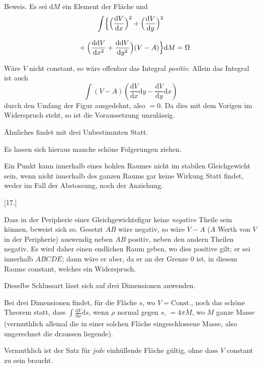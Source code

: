 Beweis. Es sei $\mathrm{d}M$ ein Element der Fläche und
\[
\begin{gathered}\int\Bigl\{
\Bigl(\frac{\mathrm{d}V}{\mathrm{d}x}\Bigr)^2
+\Bigl(\frac{\mathrm{d}V}{\mathrm{d}y}\Bigr)^2
\\[8pt]\quad{}+\Bigl(\frac{\mathrm{dd}V}{\mathrm{d}x^2}
+\frac{\mathrm{dd}V}{\mathrm{d}y^2}\Bigr)(V-A)
\Bigr\}\mathrm{d}M=\Omega\end{gathered}
\]


Wäre $V$ nicht constant, so wäre offenbar das Integral \emph{positiv}. Allein das Integral ist auch
\[
\int(V-A)\left(\frac{\mathrm{d}V}{\mathrm{d}x}\mathrm{d}y
-\frac{\mathrm{d}V}{\mathrm{d}y}\mathrm{d}x\right)
\]
durch den Umfang der Figur ausgedehnt, also $=0$. Da dies mit dem Vorigen
im Widerspruch steht, so ist die Voraussetzung unzulässig.

Ähnliches findet mit drei Unbestimmten Statt.

Es lassen sich hieraus manche schöne Folgerungen ziehen.

Ein Punkt kann innerhalb eines hohlen Raumes nicht im stabilen Gleichgewicht sein, wenn nicht innerhalb des ganzen Raums gar keine Wirkung Statt
findet, weder im Fall der Abstossung, noch der Anziehung.

\par\medskip{}\centerline{[17.]}\nobreak\smallskip
Dass in der Peripherie einer Gleichgewichtsfigur keine \emph{negative} Theile sein
können, beweist sich so. Gesetzt $AB$ wäre negativ, so wäre $V-A$ ($A$ Werth
von $V$ in der Peripherie) auswendig neben $AB$ positiv, neben den andern Theilen negativ. Es wird daher einen endlichen Raum geben, wo dies positive gilt;
er sei innerhalb $ABCDE$; dann wäre er aber, da er an der Grenze $0$ ist, in
diesem Raume constant, welches ein Widerspruch.

Dieselbe Schlussart lässt sich auf drei Dimensionen anwenden.

Bei drei Dimensionen findet, für die Fläche $s$, wo $V=\mathrm{Const.}$, noch das
schöne Theorem statt, dass $\int\frac{\mathrm{d}V}{\mathrm{d}\rho}\mathrm{d}s$,
wenn $\rho$ normal gegen $s$, $=4\pi M$, wo $M$
ganze Masse (vermuthlich allemal die in einer solchen Fläche eingeschlossene
Masse, also ungerechnet die draussen liegende).

Vermuthlich ist der Satz für \emph{jede} einhüllende Fläche gültig, ohne dass $V$
constant zu sein braucht.

